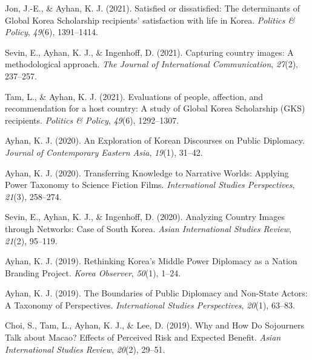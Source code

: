 \documentclass[11pt,a4paper,]{awesome-cv}
\begin{document}
\leavevmode{}%
Jon, J.-E., \& Ayhan, K. J. (2021). Satisfied or dissatisfied: {The}
determinants of {Global} {Korea} {Scholarship} recipients' satisfaction
with life in {Korea}. \emph{Politics \& Policy}, \emph{49}(6),
1391--1414.

\leavevmode{}%
Sevin, E., Ayhan, K. J., \& Ingenhoff, D. (2021). Capturing country
images: A methodological approach. \emph{The Journal of International
Communication}, \emph{27}(2), 237--257.

\leavevmode{}%
Tam, L., \& Ayhan, K. J. (2021). Evaluations of people, affection, and
recommendation for a host country: {A} study of {Global} {Korea}
{Scholarship} ({GKS}) recipients. \emph{Politics \& Policy},
\emph{49}(6), 1292--1307.

\leavevmode{}%
Ayhan, K. J. (2020). An {Exploration} of {Korean} {Discourses} on
{Public} {Diplomacy}. \emph{Journal of Contemporary Eastern Asia},
\emph{19}(1), 31--42.

\leavevmode{}%
Ayhan, K. J. (2020). Transferring {Knowledge} to {Narrative} {Worlds}:
{Applying} {Power} {Taxonomy} to {Science} {Fiction} {Films}.
\emph{International Studies Perspectives}, \emph{21}(3), 258--274.

\leavevmode{}%
Sevin, E., Ayhan, K. J., \& Ingenhoff, D. (2020). Analyzing {Country}
{Images} through {Networks}: {Case} of {South} {Korea}. \emph{Asian
International Studies Review}, \emph{21}(2), 95--119.

\leavevmode{}%
Ayhan, K. J. (2019). Rethinking {Korea}'s {Middle} {Power} {Diplomacy}
as a {Nation} {Branding} {Project}. \emph{Korea Observer}, \emph{50}(1),
1--24.

\leavevmode{}%
Ayhan, K. J. (2019). The {Boundaries} of {Public} {Diplomacy} and
{Non}-{State} {Actors}: {A} {Taxonomy} of {Perspectives}.
\emph{International Studies Perspectives}, \emph{20}(1), 63--83.

\leavevmode{}%
Choi, S., Tam, L., Ayhan, K. J., \& Lee, D. (2019). Why and {How} {Do}
{Sojourners} {Talk} about {Macao}? {Effects} of {Perceived} {Risk} and
{Expected} {Benefit}. \emph{Asian International Studies Review},
\emph{20}(2), 29--51.
\end{document}

